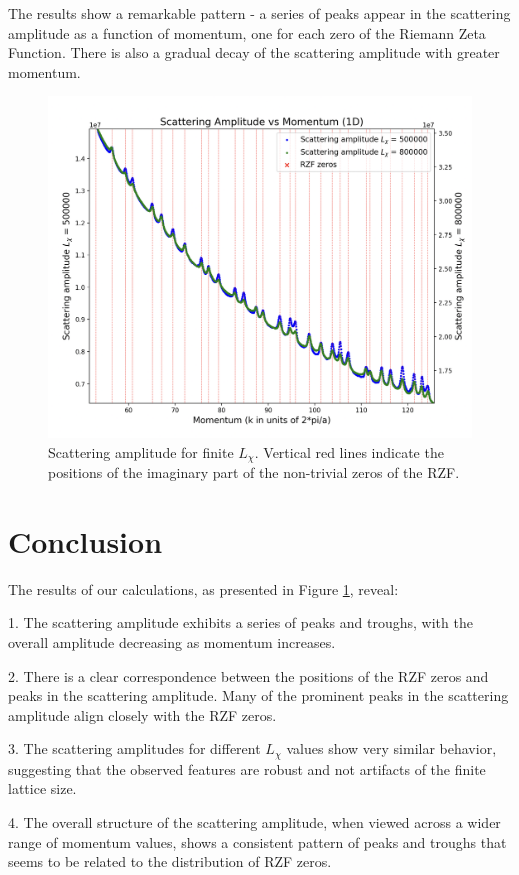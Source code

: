 \documentclass[11pt, oneside]{article}
\begin{document}
The results show a remarkable pattern - a series of peaks appear in the scattering amplitude as a function of momentum, one for each zero of the Riemann Zeta Function. 
There is also a gradual decay of the scattering amplitude with greater momentum.
\begin{figure}[htbp]
\begin{center}
    \includegraphics[width=0.8\linewidth]{zoomed_scattering.png}
\caption{Scattering amplitude for finite $L_{\chi}$. Vertical red lines indicate the positions of the imaginary part of the non-trivial zeros of the RZF.}
\label{fig:scattering_amplitude}
\end{center}
\end{figure}

\section{Conclusion}

The results of our calculations, as presented in Figure \ref{fig:scattering_amplitude}, reveal:

1. The scattering amplitude exhibits a series of peaks and troughs, with the overall amplitude decreasing as momentum increases.

2. There is a clear correspondence between the positions of the RZF zeros and peaks in the scattering amplitude. Many of the prominent peaks in the scattering amplitude align closely with the RZF zeros.

3. The scattering amplitudes for different $L_\chi$ values show very similar behavior, suggesting that the observed features are robust and not artifacts of the finite lattice size.

4. The overall structure of the scattering amplitude, when viewed across a wider range of momentum values, shows a consistent pattern of peaks and troughs that seems to be related to the distribution of RZF zeros.
\end{document}
